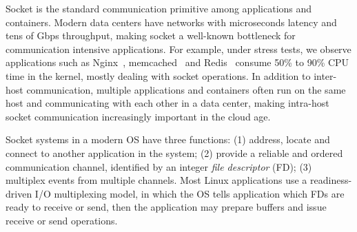 Socket is the standard communication primitive among applications and containers.
Modern data centers have networks with microseconds latency and tens of Gbps throughput, making socket a well-known bottleneck for communication intensive applications.
For example, under stress tests, we observe applications such as Nginx~\cite{reese2008nginx}, memcached~\cite{fitzpatrick2004distributed} and Redis~\cite{carlson2013redis} consume 50\% to 90\% CPU time in the kernel, mostly dealing with socket operations.
In addition to inter-host communication, multiple applications and containers often run on the same host and communicating with each other in a data center, making intra-host socket communication increasingly important in the cloud age.

Socket systems in a modern OS have three functions:
(1) address, locate and connect to another application in the system; %
(2) provide a reliable and ordered communication channel, identified by an integer \emph{file descriptor} (FD);
(3) multiplex events from multiple channels.
Most Linux applications use a readiness-driven I/O multiplexing model, in which the OS tells application which FDs are ready to receive or send, then the application may prepare buffers and issue receive or send operations.


